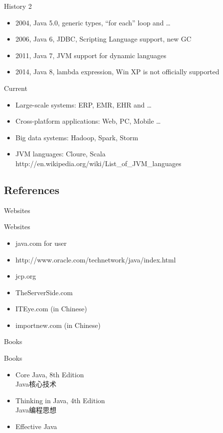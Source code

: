 \documentclass[UTF8]{beamer}
\begin{document}
\begin{frame}[t]{History 2}
  \begin{itemize}
    \item 2004, Java 5.0, generic types, ``for each'' loop and \ldots
    \item 2006, Java 6, JDBC, Scripting Language support, new GC
    \item 2011, Java 7, JVM support for dynamic languages
    \item 2014, Java 8, lambda expression, Win XP is not officially supported
  \end{itemize}
\end{frame}

\begin{frame}[t]{Current}
  \begin{itemize}
    \item Large-scale systems: ERP, EMR, EHR and \ldots
    \item Cross-platform applications: Web, PC, Mobile \ldots
    \item Big data systems: Hadoop, Spark, Storm
    \item JVM languages: Cloure, Scala\\
    http://en.wikipedia.org/wiki/List_of_JVM_languages
  \end{itemize}
\end{frame}


\subsection{References}

\begin{frame}[t]{Websites}
  \begin{block}{Websites}
    \begin{itemize}
      \item java.com for user
      \item http://www.oracle.com/technetwork/java/index.html
      \item jcp.org
      \item TheServerSide.com
      \item ITEye.com (in Chinese)
      \item importnew.com (in Chinese)
    \end{itemize}
  \end{block}
\end{frame}

\begin{frame}[t]{Books}
  \begin{block}{Books}
    \begin{itemize}
      \item Core Java, 8th Edition\\
      Java核心技术
      \item Thinking in Java, 4th Edition\\
      Java编程思想
      \item Effective Java
    \end{itemize}
  \end{block}
\end{frame}
\end{document}
